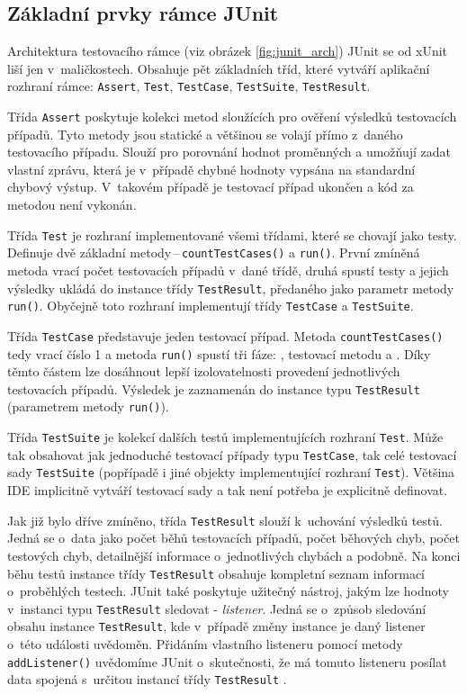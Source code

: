     \subsection{Základní prvky rámce JUnit}
    \label{section:JUnit}
    Architektura testovacího rámce (viz obrázek \ref{fig:junit_arch}) JUnit se od xUnit liší jen v~maličkostech. Obsahuje pět základních tříd, které vytváří aplikační rozhraní rámce: \texttt{Assert}, \texttt{Test}, \texttt{TestCase}, \texttt{TestSuite}, \texttt{TestResult}.

    Třída \texttt{Assert} poskytuje kolekci metod sloužících pro ověření výsledků testovacích případů. Tyto metody jsou statické a většinou se volají přímo z~daného testovacího případu. Slouží pro porovnání hodnot proměnných a umožňují zadat vlastní zprávu, která je v~případě chybné hodnoty vypsána na standardní chybový výstup. V~takovém případě je testovací případ ukončen a kód za metodou není vykonán.

    Třída \texttt{Test} je rozhraní implementované všemi třídami, které se chovají jako testy. Definuje dvě základní metody\,--\,\texttt{countTestCases()} a \texttt{run()}. První zmíněná metoda vrací počet testovacích případů v~dané třídě, druhá spustí testy a jejich výsledky ukládá do instance třídy \texttt{TestResult}, předaného jako parametr metody \texttt{run()}. Obyčejně toto rozhraní implementují třídy \texttt{TestCase} a \texttt{TestSuite}.

    Třída \texttt{TestCase} představuje jeden testovací případ. Metoda \texttt{countTestCases()} tedy vrací číslo 1 a metoda \texttt{run()} spustí tři fáze: , testovací metodu a . Díky těmto částem lze dosáhnout lepší izolovatelnosti provedení jednotlivých testovacích případů. Výsledek je zaznamenán do instance typu \texttt{TestResult} (parametrem metody \texttt{run()}).

    Třída \texttt{TestSuite} je kolekcí dalších testů implementujících rozhraní \texttt{Test}. Může tak obsahovat jak jednoduché testovací případy typu \texttt{TestCase}, tak celé testovací sady \texttt{TestSuite} (popřípadě i jiné objekty implementující rozhraní \texttt{Test}). Většina IDE implicitně vytváří testovací sady a tak není potřeba je explicitně definovat.

    Jak již bylo dříve zmíněno, třída \texttt{TestResult} slouží k~uchování výsledků testů. Jedná se o~data jako počet běhů testovacích případů, počet běhových chyb, počet testových chyb, detailnější informace o~jednotlivých chybách a podobně. Na konci běhu testů instance třídy \texttt{TestResult} obsahuje kompletní seznam informací o~proběhlých testech. JUnit také poskytuje užitečný nástroj, jakým lze hodnoty v~instanci typu \texttt{TestResult} sledovat - \emph{listener}. Jedná se o~způsob sledování obsahu instance \texttt{TestResult}, kde v~případě změny instance je daný listener o~této události uvědoměn. Přidáním vlastního listeneru pomocí metody \texttt{addListener()} uvědomíme JUnit o~skutečnosti, že má tomuto listeneru posílat data spojená s~určitou instancí třídy \texttt{TestResult} \cite{JUnitGuide}.

